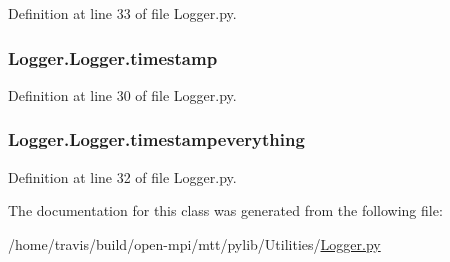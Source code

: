 Definition at line 33 of file Logger.\-py.

\hypertarget{class_logger_1_1_logger_af1d68b73fec8eebd0abeafa3bc8fd98b}{
\subsubsection[{timestamp}]{\setlength{\rightskip}{0pt plus 5cm}Logger.\-Logger.\-timestamp}}\label{class_logger_1_1_logger_af1d68b73fec8eebd0abeafa3bc8fd98b}


Definition at line 30 of file Logger.\-py.

\hypertarget{class_logger_1_1_logger_a6012f50ab21e5ab3b89465a972b6a99d}{
\subsubsection[{timestampeverything}]{\setlength{\rightskip}{0pt plus 5cm}Logger.\-Logger.\-timestampeverything}}\label{class_logger_1_1_logger_a6012f50ab21e5ab3b89465a972b6a99d}


Definition at line 32 of file Logger.\-py.



The documentation for this class was generated from the following file\-:\begin{DoxyCompactItemize}
\item 
/home/travis/build/open-\/mpi/mtt/pylib/\-Utilities/\hyperlink{_logger_8py}{Logger.\-py}\end{DoxyCompactItemize}
